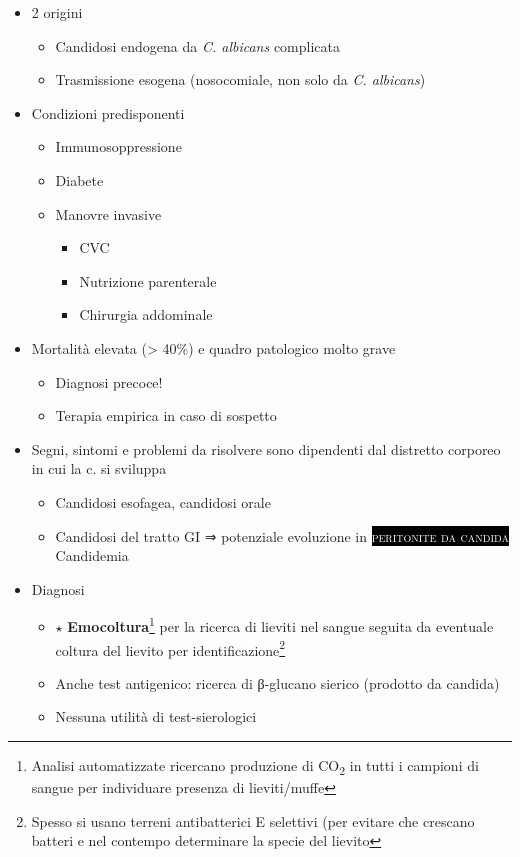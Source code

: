 \documentclass[italian,]{article}
\providecommand{\tightlist}{%
  \setlength{\itemsep}{0pt}\setlength{\parskip}{0pt}}
\newcommand{\pat}[1]{\colorbox{black}{\textcolor{white}{\textsc{#1}}}}
\newcommand{\goldstandard}{\textcircled{$\star$} }                      %
\begin{document}
\begin{itemize}
\tightlist
\item
  2 origini

  \begin{itemize}
  \tightlist
  \item
    Candidosi endogena da \emph{C. albicans} complicata
  \item
    Trasmissione esogena (nosocomiale, non solo da \emph{C. albicans})
  \end{itemize}
\item
  Condizioni predisponenti

  \begin{itemize}
  \tightlist
  \item
    Immunosoppressione
  \item
    Diabete
  \item
    Manovre invasive

    \begin{itemize}
    \tightlist
    \item
      CVC
    \item
      Nutrizione parenterale
    \item
      Chirurgia addominale
    \end{itemize}
  \end{itemize}
\item
  Mortalità elevata (\textgreater{} 40\%) e quadro patologico molto
  grave

  \begin{itemize}
  \tightlist
  \item
    Diagnosi precoce!
  \item
    Terapia empirica in caso di sospetto
  \end{itemize}
\item
  Segni, sintomi e problemi da risolvere sono dipendenti dal distretto
  corporeo in cui la c. si sviluppa

  \begin{itemize}
  \tightlist
  \item
    Candidosi esofagea, candidosi orale
  \item
    Candidosi del tratto GI ⇒ potenziale evoluzione in
    \pat{peritonite da candida} Candidemia
  \end{itemize}
\item
  Diagnosi

  \begin{itemize}
  \tightlist
  \item
    \goldstandard \textbf{Emocoltura}\footnote{Analisi automatizzate
      ricercano produzione di CO\textsubscript{2} in tutti i campioni di
      sangue per individuare presenza di lieviti/muffe} per la ricerca
    di lieviti nel sangue seguita da eventuale coltura del lievito per
    identificazione\footnote{Spesso si usano terreni antibatterici E
      selettivi (per evitare che crescano batteri e nel contempo
      determinare la specie del lievito}
  \item
    Anche test antigenico: ricerca di β-glucano sierico (prodotto da
    candida)
  \item
    Nessuna utilità di test-sierologici
  \end{itemize}
\end{itemize}
\end{document}
